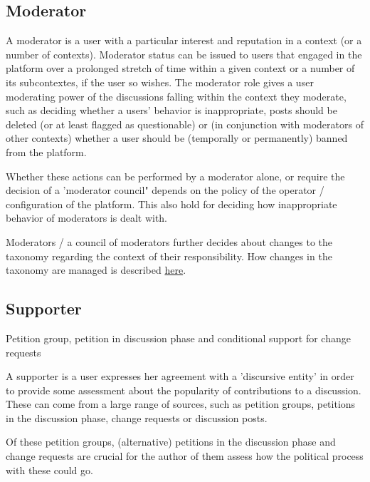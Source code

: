\subsection{Moderator}
\label{ssec:Roles_Moderator}
A moderator is a user with a particular interest and reputation in a context (or a number of contexts). Moderator status can be issued to users that engaged in the platform over a prolonged stretch of time within a given context or a number of its subcontextes, if the user so wishes. The moderator role gives a user moderating power of the discussions falling within the context they moderate, such as deciding whether a users' behavior is inappropriate, posts should be deleted (or at least flagged as questionable) or (in conjunction with moderators of other contexts) whether a user should be (temporally or permanently) banned from the platform. 

Whether these actions can be performed by a moderator alone, or require the decision of a 'moderator council" depends on the policy of the operator / configuration of the platform. This also hold for deciding how inappropriate behavior of moderators is dealt with.

Moderators / a council of moderators further decides about changes to the taxonomy regarding the context of their responsibility. How changes in the taxonomy are managed is described \hyperref[sec:Model_Contexts]{here}.

\subsection{Supporter}
\label{ssec:Roles_Supporter}
Petition group, petition in discussion phase and conditional support for change requests

A supporter is a user expresses her agreement with a 'discursive entity' in order to provide some assessment about the popularity of contributions to a discussion. These can come from a large range of sources, such as petition groups, petitions in the discussion phase, change requests or discussion posts. 

Of these petition groups, (alternative) petitions in the discussion phase and change requests are crucial for the author of them assess how the political process with these could go.

